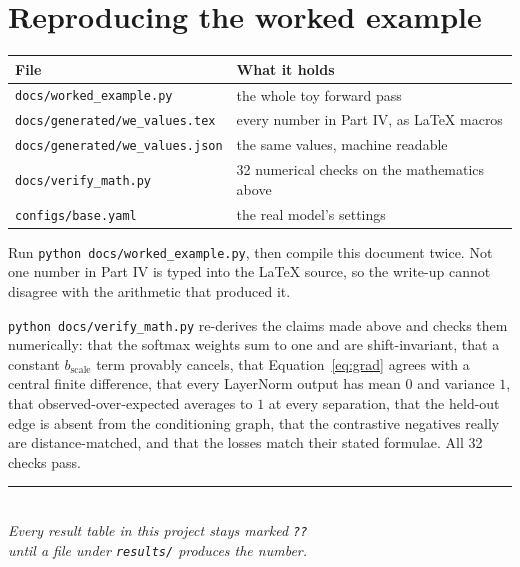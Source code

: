 \documentclass[11pt,a4paper]{article}
\newcommand{\code}[1]{\texttt{\small #1}}
\begin{document}
\section{Reproducing the worked example}

\begin{center}
\begin{tabular}{@{}l l@{}}
\toprule
\textbf{File} & \textbf{What it holds}\\
\midrule
\code{docs/worked\_example.py} & the whole toy forward pass\\
\code{docs/generated/we\_values.tex} & every number in Part IV, as \LaTeX{} macros\\
\code{docs/generated/we\_values.json} & the same values, machine readable\\
\code{docs/verify\_math.py} & 32 numerical checks on the mathematics above\\
\code{configs/base.yaml} & the real model's settings\\
\bottomrule
\end{tabular}
\end{center}

Run \code{python docs/worked\_example.py}, then compile this document twice. Not
one number in Part IV is typed into the \LaTeX{} source, so the write-up cannot
disagree with the arithmetic that produced it.

\code{python docs/verify\_math.py} re-derives the claims made above and checks
them numerically: that the softmax weights sum to one and are shift-invariant,
that a constant $b_{\mathrm{scale}}$ term provably cancels, that
Equation~\eqref{eq:grad} agrees with a central finite difference, that every
LayerNorm output has mean $0$ and variance $1$, that observed-over-expected
averages to $1$ at every separation, that the held-out edge is absent from the
conditioning graph, that the contrastive negatives really are distance-matched,
and that the losses match their stated formulae. All 32 checks pass.

\vfill
\begin{center}
\rule{0.35\textwidth}{0.4pt}\\[4pt]
{\small\itshape Every result table in this project stays marked \texttt{??}\\
until a file under \texttt{results/} produces the number.}
\end{center}
\end{document}
